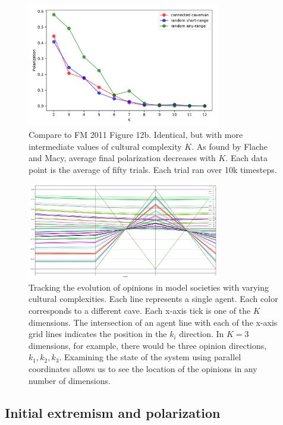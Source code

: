 \documentclass[11pt,letterpaper]{article}
\begin{document}
\begin{figure}
  \centering
      \includegraphics[width=0.75\textwidth]{Figures/finegrained_p_vs_K.pdf}
  \caption{
    Compare to FM 2011 Figure 12b. Identical, but with more intermediate
    values of cultural complexity $K$. As found by Flache and Macy, 
    average final polarization decreases with $K$. Each
    data point is the average of fifty trials. Each trial ran over 
    10k timesteps.
  }
  \label{fig:k_finegrained}
\end{figure}

\begin{figure}
  \centering
  \includegraphics[width=0.75\textwidth]{parallel_coords_k=4.png}
  \caption{Tracking the evolution of opinions in model societies with varying
    cultural complexities. Each line represents a single agent. Each color
    corresponds to a different cave. 
    Each x-axis tick is one of the $K$ dimensions.
    The intersection of an agent line with each of the x-axis grid lines indicates
    the position in the $k_i$ direction. In $K=3$ dimensions, for example, 
    there would be three opinion directions, $k_1, k_2, k_3$.
    Examining the state of the system using parallel 
    coordinates allows us to see the location of the opinions in any number
    of dimensions.}
  \label{fig:parallel-coords}
\end{figure}

\subsection{Initial extremism and polarization}
\end{document}

